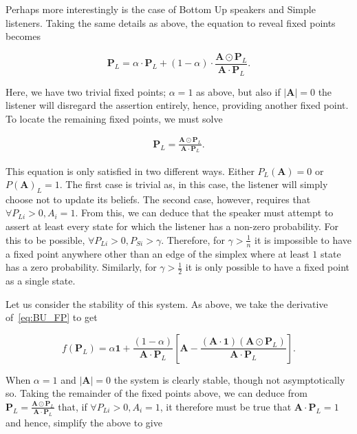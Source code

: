 Perhaps more interestingly is the case of Bottom Up speakers and Simple listeners. Taking the same details as above, the equation to reveal fixed points becomes

\begin{equation}
    \mathbf{P}_L = \alpha \cdot \mathbf{P}_L + (1 - \alpha) \cdot \frac{\mathbf{A} \odot \mathbf{P}_L}{\mathbf{A} \cdot \mathbf{P}_L}. \label{eq:BU_FP}
\end{equation}

Here, we have two trivial fixed points; $\alpha = 1$ as above, but also if $|\mathbf{A}| = 0$ the listener will disregard the assertion entirely, hence, providing another fixed point. To locate the remaining fixed points, we must solve 

\begin{align*}
    \mathbf{P}_L = \frac{\mathbf{A} \odot \mathbf{P}_L}{\mathbf{A} \cdot \mathbf{P}_L}.
\end{align*}

This equation is only satisfied in two different ways. Either $P_L(\mathbf{A}) = 0 $ or $P(\mathbf{A})_L = 1$. The first case is trivial as, in this case, the listener will simply choose not to update its beliefs. The second case, however, requires that $ \forall P_{Li} > 0, A_i = 1 $. From this, we can deduce that the speaker must attempt to assert at least every state for which the listener has a non-zero probability. For this to be possible, $\forall P_{Li} > 0, P_{Si} > \gamma$. Therefore, for $\gamma > \frac{1}{n}$ it is impossible to have a fixed point anywhere other than an edge of the simplex where at least $1$ state has a zero probability. Similarly, for $\gamma > \frac{1}{2}$ it is only possible to have a fixed point as a single state. 

Let us consider the stability of this system. As above, we take the derivative of~\cref{eq:BU_FP} to get

\begin{equation*}
    f(\mathbf{P}_L) = \alpha \mathbf{1} + \frac{(1- \alpha)}{\mathbf{A} \cdot \mathbf{P}_L} \left[ \mathbf{A} - \frac{(\mathbf{A} \cdot \mathbf{1})(\mathbf{A} \odot \mathbf{P}_L) }{\mathbf{A} \cdot \mathbf{P}_L} \right] .
\end{equation*} 

When $\alpha = 1$ and $|\mathbf{A}| = 0$ the system is clearly stable, though not asymptotically so. Taking the remainder of the fixed points above, we can deduce from $\mathbf{P}_L = \frac{\mathbf{A} \odot \mathbf{P}_L}{\mathbf{A} \cdot \mathbf{P}_L}$ that, if $ \forall P_{Li} > 0, A_i = 1 $, it therefore must be true that $\mathbf{A} \cdot \mathbf{P}_L = 1$ and hence, simplify the above to give
    

